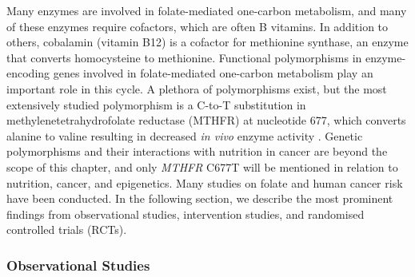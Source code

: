 \noindent Many enzymes are involved in folate-mediated one-carbon metabolism, and many of these enzymes require cofactors, which are often B vitamins. In addition to others, cobalamin (vitamin B12) is a cofactor for methionine synthase, an enzyme that converts homocysteine to methionine. Functional polymorphisms in enzyme-encoding genes involved in folate-mediated one-carbon metabolism play an important role in this cycle. A plethora of polymorphisms exist, but the most extensively studied polymorphism is a C-to-T substitution in methylenetetrahydrofolate reductase (MTHFR) at nucleotide 677, which converts alanine to valine resulting in decreased \emph{in vivo} enzyme activity \cite{c228}. Genetic polymorphisms and their interactions with nutrition in cancer are beyond the scope of this chapter, and only \emph{MTHFR} C677T will be mentioned in relation to nutrition, cancer, and epigenetics. Many studies on folate and human cancer risk have been conducted. In the following section, we describe the most prominent findings from observational studies, intervention studies, and randomised controlled trials (RCTs).

\subsubsection{Observational Studies} %
